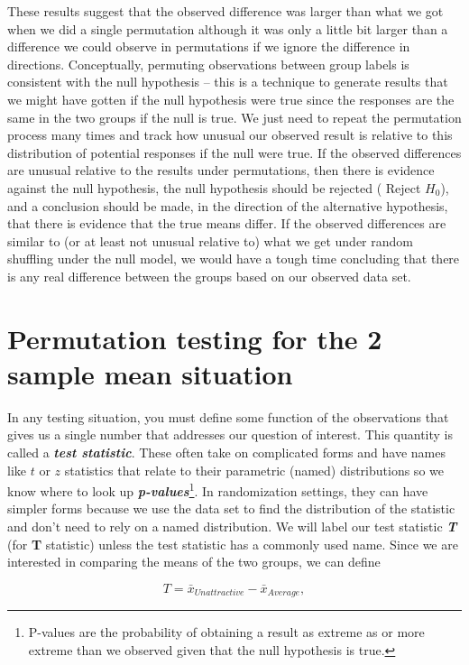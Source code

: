 \documentclass[]{book}
\let\rmarkdownfootnote\footnote%
\def\footnote{\protect\rmarkdownfootnote}
\theoremstyle{definition}
\theoremstyle{definition}
\theoremstyle{remark}
\begin{document}
These results suggest that the observed difference was larger than what
we got when we did a single permutation although it was only a little
bit larger than a difference we could observe in permutations if we
ignore the difference in directions. Conceptually, permuting
observations between group labels is consistent with the null hypothesis
-- this is a technique to generate results that we might have gotten if
the null hypothesis were true since the responses are the same in the
two groups if the null is true. We just need to repeat the permutation
process many times and track how unusual our observed result is relative
to this distribution of potential responses if the null were true. If
the observed differences are unusual relative to the results under
permutations, then there is evidence against the null hypothesis, the
null hypothesis should be rejected ( Reject \(H_0\)), and a conclusion
should be made, in the direction of the alternative hypothesis, that
there is evidence that the true means differ. If the observed
differences are similar to (or at least not unusual relative to) what we
get under random shuffling under the null model, we would have a tough
time concluding that there is any real difference between the groups
based on our observed data set.

\section{Permutation testing for the 2 sample mean
situation}\label{section2-4}

In any testing situation, you must define some function of the
observations that gives us a single number that addresses our question
of interest. This quantity is called a \textbf{\emph{test statistic}}.
These often take on complicated forms and have names like \(t\) or \(z\)
statistics that relate to their parametric (named) distributions so we
know where to look up \textbf{\emph{p-values}}\footnote{P-values are the
  probability of obtaining a result as extreme as or more extreme than
  we observed given that the null hypothesis is true.}. In randomization
settings, they can have simpler forms because we use the data set to
find the distribution of the statistic and don't need to rely on a named
distribution. We will label our test statistic \textbf{\emph{T}} (for
\textbf{T} statistic) unless the test statistic has a commonly used
name. Since we are interested in comparing the means of the two groups,
we can define

\[T=\bar{x}_{Unattractive}-\bar{x}_{Average},\]
\end{document}
